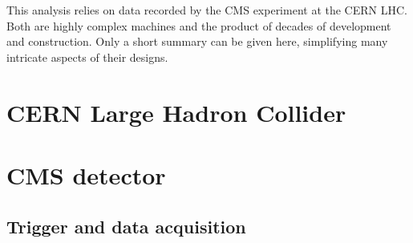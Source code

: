 \label{sec:setup}
This analysis relies on data recorded by the CMS experiment at the CERN LHC. Both are highly complex machines and the product of decades of development and construction. Only a short summary can be given here, simplifying many intricate aspects of their designs.
\section{CERN Large Hadron Collider}

\section{CMS detector}

\subsection{Trigger and data acquisition}
\label{sec:trigger}
